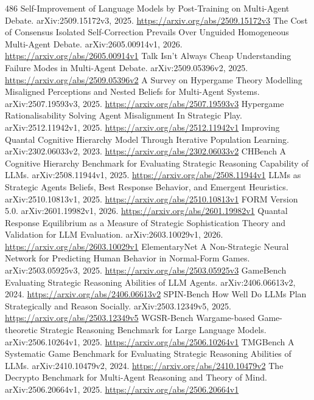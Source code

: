 \documentclass[11pt]{article}
\begin{document}
\begin{thebibliography}{486}
 Self-Improvement of Language Models by Post-Training on Multi-Agent Debate. arXiv:2509.15172v3, 2025. \url{https://arxiv.org/abs/2509.15172v3}
 The Cost of Consensus Isolated Self-Correction Prevails Over Unguided Homogeneous Multi-Agent Debate. arXiv:2605.00914v1, 2026. \url{https://arxiv.org/abs/2605.00914v1}
 Talk Isn't Always Cheap Understanding Failure Modes in Multi-Agent Debate. arXiv:2509.05396v2, 2025. \url{https://arxiv.org/abs/2509.05396v2}
 A Survey on Hypergame Theory Modelling Misaligned Perceptions and Nested Beliefs for Multi-Agent Systems. arXiv:2507.19593v3, 2025. \url{https://arxiv.org/abs/2507.19593v3}
 Hypergame Rationalisability Solving Agent Misalignment In Strategic Play. arXiv:2512.11942v1, 2025. \url{https://arxiv.org/abs/2512.11942v1}
 Improving Quantal Cognitive Hierarchy Model Through Iterative Population Learning. arXiv:2302.06033v2, 2023. \url{https://arxiv.org/abs/2302.06033v2}
 CHBench A Cognitive Hierarchy Benchmark for Evaluating Strategic Reasoning Capability of LLMs. arXiv:2508.11944v1, 2025. \url{https://arxiv.org/abs/2508.11944v1}
 LLMs as Strategic Agents Beliefs, Best Response Behavior, and Emergent Heuristics. arXiv:2510.10813v1, 2025. \url{https://arxiv.org/abs/2510.10813v1}
 FORM Version 5.0. arXiv:2601.19982v1, 2026. \url{https://arxiv.org/abs/2601.19982v1}
 Quantal Response Equilibrium as a Measure of Strategic Sophistication Theory and Validation for LLM Evaluation. arXiv:2603.10029v1, 2026. \url{https://arxiv.org/abs/2603.10029v1}
 ElementaryNet A Non-Strategic Neural Network for Predicting Human Behavior in Normal-Form Games. arXiv:2503.05925v3, 2025. \url{https://arxiv.org/abs/2503.05925v3}
 GameBench Evaluating Strategic Reasoning Abilities of LLM Agents. arXiv:2406.06613v2, 2024. \url{https://arxiv.org/abs/2406.06613v2}
 SPIN-Bench How Well Do LLMs Plan Strategically and Reason Socially. arXiv:2503.12349v5, 2025. \url{https://arxiv.org/abs/2503.12349v5}
 WGSR-Bench Wargame-based Game-theoretic Strategic Reasoning Benchmark for Large Language Models. arXiv:2506.10264v1, 2025. \url{https://arxiv.org/abs/2506.10264v1}
 TMGBench A Systematic Game Benchmark for Evaluating Strategic Reasoning Abilities of LLMs. arXiv:2410.10479v2, 2024. \url{https://arxiv.org/abs/2410.10479v2}
 The Decrypto Benchmark for Multi-Agent Reasoning and Theory of Mind. arXiv:2506.20664v1, 2025. \url{https://arxiv.org/abs/2506.20664v1}

\end{thebibliography}
\end{document}
